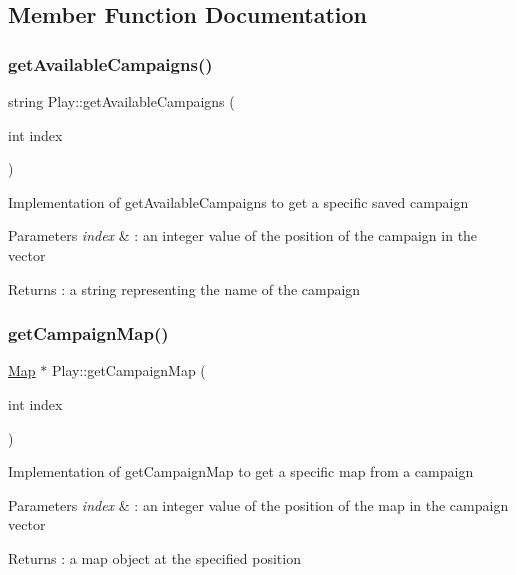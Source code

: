 \subsection{Member Function Documentation}
\hypertarget{class_play_a6b634b628eae6bf5af028b5e3c3f7c8b}{}\label{class_play_a6b634b628eae6bf5af028b5e3c3f7c8b} 
\subsubsection{\texorpdfstring{get\+Available\+Campaigns()}{getAvailableCampaigns()}}
{\footnotesize\ttfamily string Play\+::get\+Available\+Campaigns (\begin{DoxyParamCaption}\item[{int}]{index }\end{DoxyParamCaption})}

Implementation of get\+Available\+Campaigns to get a specific saved campaign 
\begin{DoxyParams}{Parameters}
{\em index} & \+: an integer value of the position of the campaign in the vector \\
\hline
\end{DoxyParams}
\begin{DoxyReturn}{Returns}
\+: a string representing the name of the campaign 
\end{DoxyReturn}
\hypertarget{class_play_ac80f55229f24dce5473a3eef9ba35cb0}{}\label{class_play_ac80f55229f24dce5473a3eef9ba35cb0} 
\subsubsection{\texorpdfstring{get\+Campaign\+Map()}{getCampaignMap()}}
{\footnotesize\ttfamily \hyperlink{class_map}{Map} $\ast$ Play\+::get\+Campaign\+Map (\begin{DoxyParamCaption}\item[{int}]{index }\end{DoxyParamCaption})}

Implementation of get\+Campaign\+Map to get a specific map from a campaign 
\begin{DoxyParams}{Parameters}
{\em index} & \+: an integer value of the position of the map in the campaign vector \\
\hline
\end{DoxyParams}
\begin{DoxyReturn}{Returns}
\+: a map object at the specified position 
\end{DoxyReturn}
\hypertarget{class_play_afcc4c4ace55020c22c5a1568bd8de2fe}{}\label{class_play_afcc4c4ace55020c22c5a1568bd8de2fe} 
